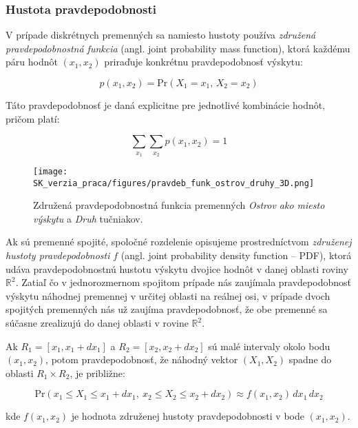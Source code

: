 \subsubsection{Hustota pravdepodobnosti}\label{subsec:joint_pdf}

V prípade diskrétnych premenných sa namiesto hustoty používa \textit{združená pravdepodobnostná funkcia} (angl. joint probability mass function), ktorá každému páru hodnôt $(x_1, x_2)$ priraďuje konkrétnu pravdepodobnosť výskytu: 

\begin{equation}
p(x_1, x_2) = \mathrm{Pr}(X_1 = x_1,\, X_2 = x_2)
\end{equation}

Táto pravdepodobnosť je daná explicitne pre jednotlivé kombinácie hodnôt, pričom platí:

\begin{equation}
\sum_{x_1} \sum_{x_2} p(x_1, x_2) = 1
\end{equation}

\begin{figure}[H]
    \centering
    \texttt{[image: SK\_verzia\_praca/figures/pravdeb\_funk\_ostrov\_druhy\_3D.png]}
    \caption{Združená pravdepodobnostná funkcia premenných \textit{Ostrov ako miesto výskytu} a \textit{Druh} tučniakov.}
    \label{fig:miesto_druh_joint_density}
\end{figure}

Ak sú premenné spojité, spoločné rozdelenie opisujeme prostredníctvom \textit{združenej hustoty pravdepodobnosti} $f$ (angl. joint probability density function – PDF), ktorá udáva pravdepodobnostnú hustotu výskytu dvojice hodnôt v danej oblasti roviny $\mathbb{R}^2$.
Zatiaľ čo v jednorozmernom spojitom prípade nás zaujímala pravdepodobnosť výskytu náhodnej premennej v určitej oblasti na reálnej osi, v prípade dvoch spojitých premenných nás už zaujíma pravdepodobnosť, že obe premenné sa súčasne zrealizujú do danej oblasti v rovine $\mathbb{R}^2$.

Ak $R_1 = [x_1, x_1 + dx_1]$ a $R_2 = [x_2, x_2 + dx_2]$ sú malé intervaly okolo bodu $(x_1, x_2)$, potom pravdepodobnosť, že náhodný vektor $(X_1, X_2)$ spadne do oblasti $R_1 \times R_2$, je približne:

\begin{equation}
\mathrm{Pr}(x_1 \leq X_1 \leq x_1 + dx_1,\ x_2 \leq X_2 \leq x_2 + dx_2) \approx f(x_1, x_2) \, dx_1 \, dx_2
\end{equation}

kde $f(x_1, x_2)$ je hodnota združenej hustoty pravdepodobnosti v bode $(x_1, x_2)$.

